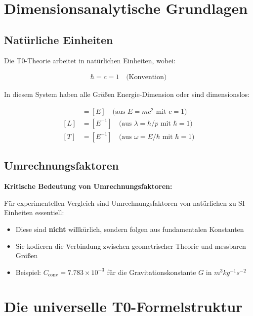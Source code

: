 \documentclass[12pt,a4paper]{article}
\begin{document}
	\section{Dimensionsanalytische Grundlagen}
	
	\subsection{Natürliche Einheiten}
	
	Die T0-Theorie arbeitet in natürlichen Einheiten, wobei:
	
	\begin{align}
		\hbar = c = 1 \quad \text{(Konvention)}
	\end{align}
	
	In diesem System haben alle Größen Energie-Dimension oder sind dimensionslos:
	
	\begin{align}
		[M] &= [E] \quad \text{(aus $E = mc^2$ mit $c = 1$)} \\
		[L] &= [E^{-1}] \quad \text{(aus $\lambda = \hbar/p$ mit $\hbar = 1$)} \\
		[T] &= [E^{-1}] \quad \text{(aus $\omega = E/\hbar$ mit $\hbar = 1$)}
	\end{align}
	
	\subsection{Umrechnungsfaktoren}
	
	\begin{warning}
		\textbf{Kritische Bedeutung von Umrechnungsfaktoren:}
		
		Für experimentellen Vergleich sind Umrechnungsfaktoren von natürlichen zu SI-Einheiten essentiell:
		\begin{itemize}
			\item Diese sind \textbf{nicht} willkürlich, sondern folgen aus fundamentalen Konstanten
			\item Sie kodieren die Verbindung zwischen geometrischer Theorie und messbaren Größen
			\item Beispiel: $C_{\text{conv}} = 7.783 \times 10^{-3}$ für die Gravitationskonstante $G$ in $\si{m^3 kg^{-1} s^{-2}}$
		\end{itemize}
	\end{warning}
	
	\section{Die universelle T0-Formelstruktur}
	
\end{document}

